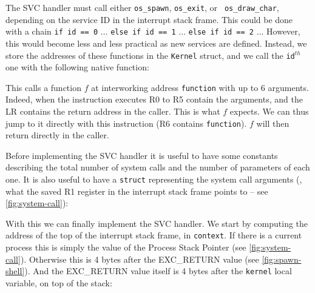 
The SVC handler must call either {\tt os\_spawn}, {\tt os\_exit}, or {\tt
os\_draw\_char}, depending on the service ID in the interrupt stack frame. This
could be done with a chain {\tt if id == 0} $\ldots$ {\tt else if id == 1}
$\ldots$ {\tt else if id == 2} $\ldots$ However, this would become less and
less practical as new services are defined. Instead, we store the addresses of
these functions in the {\tt Kernel} struct, and we call the {\tt id}$^{th}$ one
with the following native function:


This calls a function $f$ at interworking address {\tt function} with up
to 6 arguments. Indeed, when the  instruction executes R0 to R5 contain
the arguments, and the LR contains the return address in the caller. This is
what $f$ expects. We can thus jump to it directly with this instruction (R6
contains {\tt function}). $f$ will then return directly in the caller.

Before implementing the SVC handler it is useful to have some constants
describing the total number of system calls and the number of parameters of
each one. It is also useful to have a {\tt struct} representing the system call
arguments (\ie, what the saved R1 register in the interrupt stack frame points
to -- see \cref{fig:system-call}):


With this we can finally implement the SVC handler. We start by computing the
address of the top of the interrupt stack frame, in {\tt context}. If there is
a current process this is simply the value of the Process Stack Pointer (see
\cref{fig:system-call}). Otherwise this is 4 bytes after the EXC\_RETURN value
(see \cref{fig:spawn-shell}). And the EXC\_RETURN value itself is 4 bytes after
the {\tt kernel} local variable, on top of the stack:


